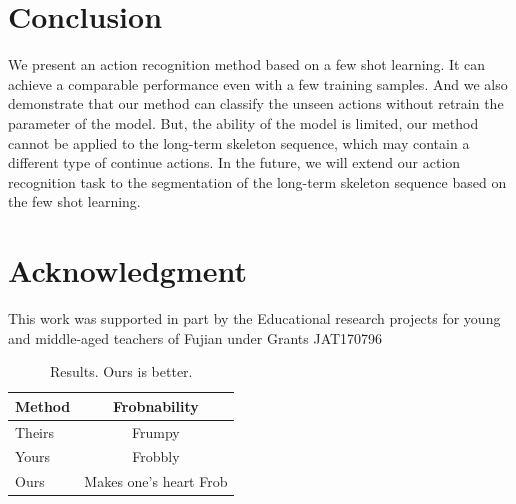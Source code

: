 \documentclass{bmvc2k}
\begin{document}
\section{Conclusion}
We present an action recognition method based on a few shot learning. It can achieve a comparable performance even with a few training samples. And we also demonstrate that our method can classify the unseen actions without retrain the parameter of the model. But, the ability of the model is limited, our method cannot be applied to the long-term skeleton sequence, which may contain a different type of continue actions. In the future, we will extend our action recognition task to the segmentation of the long-term skeleton sequence based on the few shot learning.

\section{Acknowledgment}
This work was supported in part by the Educational research projects for young and middle-aged teachers of Fujian under Grants JAT170796


%

\begin{table}
\begin{center}
\begin{tabular}{|l|c|}
\hline
Method & Frobnability \\
\hline\hline
Theirs & Frumpy \\
Yours & Frobbly \\
Ours & Makes one's heart Frob\\
\hline
\end{tabular}
\end{center}
\caption{Results.   Ours is better.}
\end{table}





\end{document}
